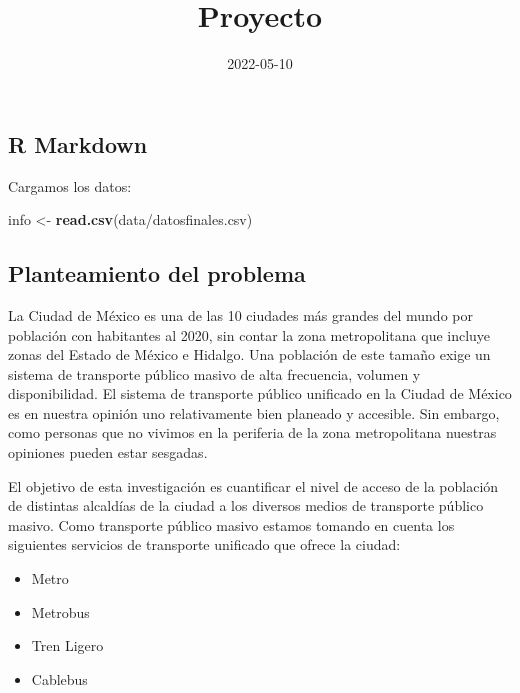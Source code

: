 \documentclass[
]{article}
\title{Proyecto}
\author{}
\date{\vspace{-2.5em}2022-05-10}
\newenvironment{Shaded}{\begin{snugshade}}{\end{snugshade}}
\newcommand{\KeywordTok}[1]{\textcolor[rgb]{0.13,0.29,0.53}{\textbf{#1}}}
\newcommand{\NormalTok}[1]{#1}
\newcommand{\StringTok}[1]{\textcolor[rgb]{0.31,0.60,0.02}{#1}}
\providecommand{\tightlist}{%
  \setlength{\itemsep}{0pt}\setlength{\parskip}{0pt}}
\begin{document}
\maketitle

\hypertarget{r-markdown}{%
\subsection{R Markdown}\label{r-markdown}}

Cargamos los datos:

\begin{Shaded}
\begin{Highlighting}[]
\NormalTok{info \textless{}{-}}\StringTok{ }\KeywordTok{read.csv}\NormalTok{(}\StringTok{\textquotesingle{}data/datosfinales.csv\textquotesingle{}}\NormalTok{)}
\end{Highlighting}
\end{Shaded}

\hypertarget{planteamiento-del-problema}{%
\subsection{Planteamiento del
problema}\label{planteamiento-del-problema}}

La Ciudad de México es una de las 10 ciudades más grandes del mundo por
población con habitantes al 2020, sin contar la zona metropolitana que
incluye zonas del Estado de México e Hidalgo. Una población de este
tamaño exige un sistema de transporte público masivo de alta frecuencia,
volumen y disponibilidad. El sistema de transporte público unificado en
la Ciudad de México es en nuestra opinión uno relativamente bien
planeado y accesible. Sin embargo, como personas que no vivimos en la
periferia de la zona metropolitana nuestras opiniones pueden estar
sesgadas.

El objetivo de esta investigación es cuantificar el nivel de acceso de
la población de distintas alcaldías de la ciudad a los diversos medios
de transporte público masivo. Como transporte público masivo estamos
tomando en cuenta los siguientes servicios de transporte unificado que
ofrece la ciudad:

\begin{itemize}
\tightlist
\item
  Metro
\item
  Metrobus
\item
  Tren Ligero
\item
  Cablebus
\end{itemize}
\end{document}
